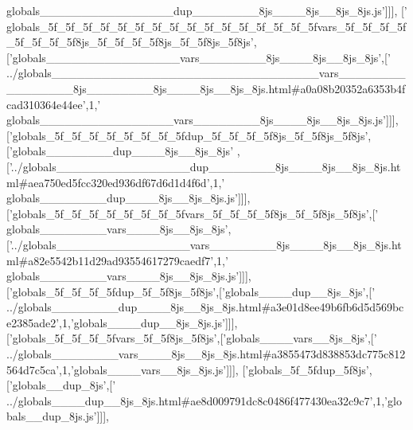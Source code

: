 \begin{DoxyCode}
{      globals\_\_\_\_\_\_\_\_\_\_\_\_\_\_\_\_dup\_\_\_\_\_\_\_\_8js\_\_\_\_8js\_\_8js\_8js.js'}]]],
  [\textcolor{stringliteral}{'
      globals\_5f\_5f\_5f\_5f\_5f\_5f\_5f\_5f\_5f\_5f\_5f\_5f\_5f\_5f\_5f\_5fvars\_5f\_5f\_5f\_5f\_5f\_5f\_5f\_5f8js\_5f\_5f\_5f\_5f8js\_5f\_5f8js\_5f8js'},[\textcolor{stringliteral}{'globals\_\_\_\_\_\_\_\_\_\_\_\_\_\_\_\_vars\_\_\_\_\_\_\_\_8js\_\_\_\_8js\_\_8js\_8js'},[\textcolor{stringliteral}{'
      ../globals\_\_\_\_\_\_\_\_\_\_\_\_\_\_\_\_\_\_\_\_\_\_\_\_\_\_\_\_\_\_\_\_vars\_\_\_\_\_\_\_\_\_\_\_\_\_\_\_\_8js\_\_\_\_\_\_\_\_8js\_\_\_\_8js\_\_8js\_8js.html#a0a08b20352a6353b4fcad310364e44ee'},1,\textcolor{stringliteral}{'
      globals\_\_\_\_\_\_\_\_\_\_\_\_\_\_\_\_vars\_\_\_\_\_\_\_\_8js\_\_\_\_8js\_\_8js\_8js.js'}]]],
  [\textcolor{stringliteral}{'globals\_5f\_5f\_5f\_5f\_5f\_5f\_5f\_5fdup\_5f\_5f\_5f\_5f8js\_5f\_5f8js\_5f8js'},[\textcolor{stringliteral}{'globals\_\_\_\_\_\_\_\_dup\_\_\_\_8js\_\_8js\_8js'}
      ,[\textcolor{stringliteral}{'../globals\_\_\_\_\_\_\_\_\_\_\_\_\_\_\_\_dup\_\_\_\_\_\_\_\_8js\_\_\_\_8js\_\_8js\_8js.html#aea750ed5fcc320ed936df67d6d1d4f6d'},1,\textcolor{stringliteral}{'
      globals\_\_\_\_\_\_\_\_dup\_\_\_\_8js\_\_8js\_8js.js'}]]],
  [\textcolor{stringliteral}{'globals\_5f\_5f\_5f\_5f\_5f\_5f\_5f\_5fvars\_5f\_5f\_5f\_5f8js\_5f\_5f8js\_5f8js'},[\textcolor{stringliteral}{'
      globals\_\_\_\_\_\_\_\_vars\_\_\_\_8js\_\_8js\_8js'},[\textcolor{stringliteral}{'../globals\_\_\_\_\_\_\_\_\_\_\_\_\_\_\_\_vars\_\_\_\_\_\_\_\_8js\_\_\_\_8js\_\_8js\_8js.html#a82e5542b11d29ad93554617279caedf7'},1,\textcolor{stringliteral}{'
      globals\_\_\_\_\_\_\_\_vars\_\_\_\_8js\_\_8js\_8js.js'}]]],
  [\textcolor{stringliteral}{'globals\_5f\_5f\_5f\_5fdup\_5f\_5f8js\_5f8js'},[\textcolor{stringliteral}{'globals\_\_\_\_dup\_\_8js\_8js'},[\textcolor{stringliteral}{'
      ../globals\_\_\_\_\_\_\_\_dup\_\_\_\_8js\_\_8js\_8js.html#a3e01d8ee49b6fb6d5d569bce2385ade2'},1,\textcolor{stringliteral}{'globals\_\_\_\_dup\_\_8js\_8js.js'}]]],
  [\textcolor{stringliteral}{'globals\_5f\_5f\_5f\_5fvars\_5f\_5f8js\_5f8js'},[\textcolor{stringliteral}{'globals\_\_\_\_vars\_\_8js\_8js'},[\textcolor{stringliteral}{'
      ../globals\_\_\_\_\_\_\_\_vars\_\_\_\_8js\_\_8js\_8js.html#a3855473d838853dc775c812564d7c5ca'},1,\textcolor{stringliteral}{'globals\_\_\_\_vars\_\_8js\_8js.js'}]]],
  [\textcolor{stringliteral}{'globals\_5f\_5fdup\_5f8js'},[\textcolor{stringliteral}{'globals\_\_dup\_8js'},[\textcolor{stringliteral}{'
      ../globals\_\_\_\_dup\_\_8js\_8js.html#ae8d009791dc8c0486f477430ea32c9c7'},1,\textcolor{stringliteral}{'globals\_\_dup\_8js.js'}]]],

\end{DoxyCode}
